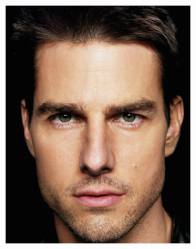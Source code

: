 \begin{figure}
\begin{subfigure}{0.23\textwidth}
        \includegraphics[width=\textwidth]{statistical_normals/images/gsfs_results/celebrities/tom_cruise_208.png}
\label{fig:tom-cruise-input}
    \end{subfigure}
    \begin{subfigure}{0.23\textwidth}
        \centering

\end{subfigure}
\end{figure}
